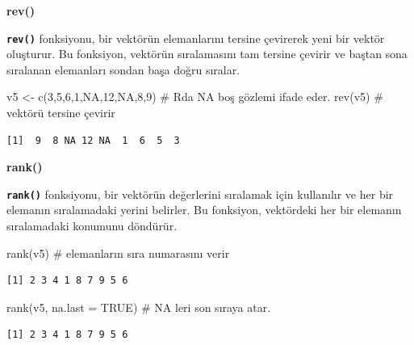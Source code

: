 \documentclass[
  letterpaper,
  DIV=11,
  numbers=noendperiod]{scrreprt}
\newenvironment{Shaded}{\begin{snugshade}}{\end{snugshade}}
\newcommand{\AttributeTok}[1]{\textcolor[rgb]{0.40,0.45,0.13}{#1}}
\newcommand{\CommentTok}[1]{\textcolor[rgb]{0.37,0.37,0.37}{#1}}
\newcommand{\ConstantTok}[1]{\textcolor[rgb]{0.56,0.35,0.01}{#1}}
\newcommand{\DecValTok}[1]{\textcolor[rgb]{0.68,0.00,0.00}{#1}}
\newcommand{\FunctionTok}[1]{\textcolor[rgb]{0.28,0.35,0.67}{#1}}
\newcommand{\NormalTok}[1]{\textcolor[rgb]{0.00,0.23,0.31}{#1}}
\newcommand{\OtherTok}[1]{\textcolor[rgb]{0.00,0.23,0.31}{#1}}
\begin{document}
\textbf{rev()}

\textbf{\texttt{rev()}} fonksiyonu, bir vektörün elemanlarını tersine
çevirerek yeni bir vektör oluşturur. Bu fonksiyon, vektörün sıralamasını
tam tersine çevirir ve baştan sona sıralanan elemanları sondan başa
doğru sıralar.

\begin{Shaded}
\begin{Highlighting}[]
\NormalTok{v5 }\OtherTok{\textless{}{-}} \FunctionTok{c}\NormalTok{(}\DecValTok{3}\NormalTok{,}\DecValTok{5}\NormalTok{,}\DecValTok{6}\NormalTok{,}\DecValTok{1}\NormalTok{,}\ConstantTok{NA}\NormalTok{,}\DecValTok{12}\NormalTok{,}\ConstantTok{NA}\NormalTok{,}\DecValTok{8}\NormalTok{,}\DecValTok{9}\NormalTok{) }\CommentTok{\# R\textquotesingle{}da NA boş gözlemi ifade eder.}
\FunctionTok{rev}\NormalTok{(v5) }\CommentTok{\# vektörü tersine çevirir}
\end{Highlighting}
\end{Shaded}

\begin{verbatim}
[1]  9  8 NA 12 NA  1  6  5  3
\end{verbatim}

\textbf{rank()}

\textbf{\texttt{rank()}} fonksiyonu, bir vektörün değerlerini sıralamak
için kullanılır ve her bir elemanın sıralamadaki yerini belirler. Bu
fonksiyon, vektördeki her bir elemanın sıralamadaki konumunu döndürür.

\begin{Shaded}
\begin{Highlighting}[]
\FunctionTok{rank}\NormalTok{(v5) }\CommentTok{\# elemanların sıra numarasını verir}
\end{Highlighting}
\end{Shaded}

\begin{verbatim}
[1] 2 3 4 1 8 7 9 5 6
\end{verbatim}

\begin{Shaded}
\begin{Highlighting}[]
\FunctionTok{rank}\NormalTok{(v5, }\AttributeTok{na.last =} \ConstantTok{TRUE}\NormalTok{) }\CommentTok{\# NA leri son sıraya atar.}
\end{Highlighting}
\end{Shaded}

\begin{verbatim}
[1] 2 3 4 1 8 7 9 5 6
\end{verbatim}
\end{document}
